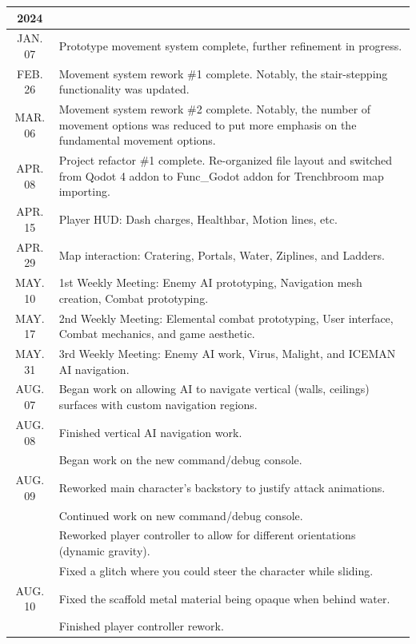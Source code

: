 \documentclass[legalpaper]{ltxdoc}
\begin{document}
	\noindent \begin{tabular}{ c|m{16cm} }
		\huge \textbf{2024} \normalsize & \\
		\hline
		JAN. 07 & Prototype movement system complete, further refinement in progress. \\
		\hline
		FEB. 26 & Movement system rework \#1 complete. Notably, the stair-stepping functionality was updated. \\
		\hline
		MAR. 06 & Movement system rework \#2 complete. Notably, the number of movement options was reduced to put more emphasis on the fundamental movement options. \\
		\hline
		APR. 08 & Project refactor \#1 complete. Re-organized file layout and switched from Qodot 4 addon to Func_Godot addon for Trenchbroom map importing. \\
		\hline
		APR. 15 & Player HUD: Dash charges, Healthbar, Motion lines, etc. \\
		\hline
		APR. 29 & Map interaction: Cratering, Portals, Water, Ziplines, and Ladders. \\
		\hline
		MAY. 10 & 1st Weekly Meeting: Enemy AI prototyping, Navigation mesh creation, Combat prototyping. \\
		\hline
		MAY. 17 & 2nd Weekly Meeting: Elemental combat prototyping, User interface, Combat mechanics, and game aesthetic. \\
		\hline
		MAY. 31 & 3rd Weekly Meeting: Enemy AI work, Virus, Malight, and ICEMAN AI navigation. \\
		\hline
		AUG. 07 & Began work on allowing AI to navigate vertical (walls, ceilings) surfaces with custom navigation regions. \\
		\hline
		AUG. 08 & Finished vertical AI navigation work. \\
		 & Began work on the new command/debug console. \\
		\hline
		AUG. 09 & Reworked main character's backstory to justify attack animations. \\
		& Continued work on new command/debug console. \\
		& Reworked player controller to allow for different orientations (dynamic gravity). \\
		& Fixed a glitch where you could steer the character while sliding. \\
		\hline
		AUG. 10 & Fixed the scaffold metal material being opaque when behind water. \\
		& Finished player controller rework. \\

\end{tabular}
\end{document}
